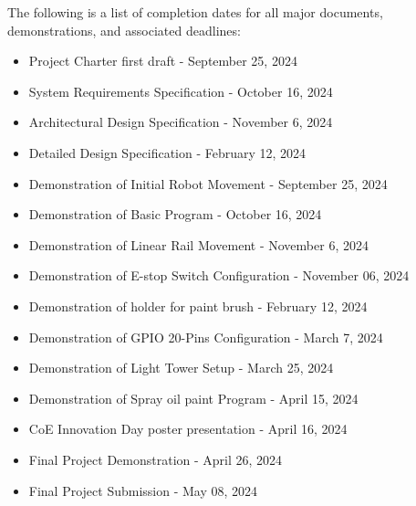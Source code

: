 The following is a list of completion dates for all major documents, demonstrations, and associated deadlines:
\begin{itemize}
  \item Project Charter first draft - September 25, 2024
  \item System Requirements Specification - October 16, 2024
  \item Architectural Design Specification - November 6, 2024
  \item Detailed Design Specification - February 12, 2024
  \item Demonstration of Initial Robot Movement - September 25, 2024
  \item Demonstration of Basic Program - October 16, 2024
  \item Demonstration of Linear Rail Movement - November 6, 2024
  \item Demonstration of E-stop Switch Configuration - November 06, 2024
  \item Demonstration of holder for paint brush - February 12, 2024
  \item Demonstration of GPIO 20-Pins Configuration - March 7, 2024
  \item Demonstration of Light Tower Setup - March 25, 2024
  \item Demonstration of Spray oil paint Program - April 15, 2024
  \item CoE Innovation Day poster presentation - April 16, 2024
  \item Final Project Demonstration - April 26, 2024
  \item Final Project Submission - May 08, 2024
\end{itemize}